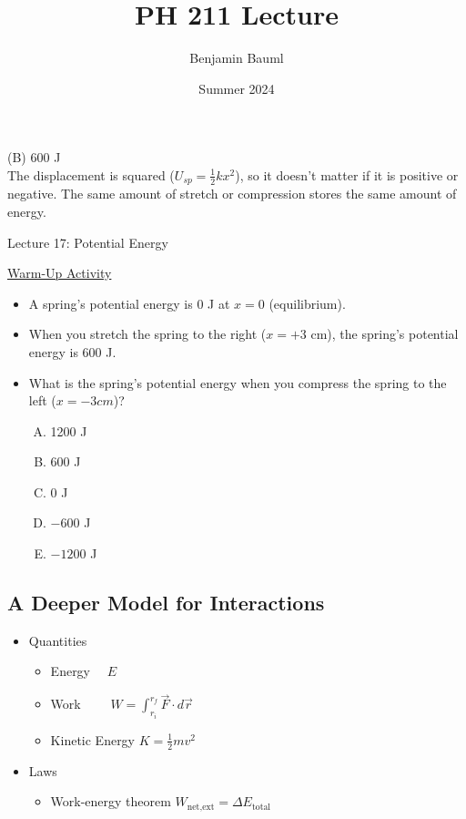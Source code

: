 \documentclass[]{article}
\title{PH 211 Lecture \Week}
\author{Benjamin Bauml}
\date{Summer 2024}
\newcommand{\Week}{17}
\begin{document}
\begin{TeacherMargin}
\noindent (B) 600 J \\
The displacement is squared ($U_{sp}=\frac{1}{2}kx^{2}$), so it doesn't matter if it is positive or negative. The same amount of stretch or compression stores the same amount of energy.
\end{TeacherMargin}
\begin{PresentSpace}
\begin{center}
	\huge Lecture \Week: Potential Energy
\end{center}
\vspace{0.5cm}
\underline{Warm-Up Activity}
\begin{itemize}
	\item A spring's potential energy is 0 J at $x=0$ (equilibrium).
	\item When you stretch the spring to the right ($x=+3$ cm), the spring's potential energy is 600 J.
	\item What is the spring's potential energy when you compress the spring to the left ($x=-3cm$)?
	\begin{multicols}{5}
	\begin{enumerate}[(A)]
		\item 1200 J
		\item 600 J
		\item 0 J
		\item $-600$ J
		\item $-1200$ J
	\end{enumerate}
	\end{multicols}
\end{itemize}
\end{PresentSpace}
\newpage
\begin{TeacherMargin}

\end{TeacherMargin}
\begin{PresentSpace}
\vspace{-10pt}
\section*{A Deeper Model for Interactions}
\vspace{-10pt}
\begin{itemize}
	\item Quantities
	\begin{itemize}
		\item Energy \qquad \qquad \qquad \quad \ \ $E$
		\item Work \qquad \qquad \qquad \quad \ \ \ \ $W = \int_{r_{i}}^{r_{f}}\vec{F}\cdot d\vec{r}$
		\item Kinetic Energy \qquad \qquad $K=\frac{1}{2}mv^{2}$
	\end{itemize}
	\item Laws
	\begin{itemize}
		\item Work-energy theorem \quad $W_{\text{net,ext}} = \Delta E_{\text{total}}$
	\end{itemize}
\end{itemize}
\end{PresentSpace}
\end{document}
